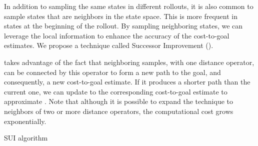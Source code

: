 In addition to sampling the same states in different rollouts, it is also common to sample states that are neighbors in the state space. This is more frequent in states at the beginning of the rollout. By sampling neighboring states, we can leverage the local information to enhance the accuracy of the cost-to-goal estimates. We propose a technique called Successor Improvement (\hvfc).

\hvfc takes advantage of the fact that neighboring samples, with one distance operator, can be connected by this operator to form a new path to the goal, and consequently, a new cost-to-goal estimate. If it produces a shorter path than the current one, we can update to the corresponding cost-to-goal estimate to approximate \hstar. Note that although it is possible to expand the technique to neighbors of two or more distance operators, the computational cost grows exponentially.

\begin{algorithm}[h]
    \SetAlgoLined




    \caption{SUI algorithm}
    \label{alg:sui}
\end{algorithm}

